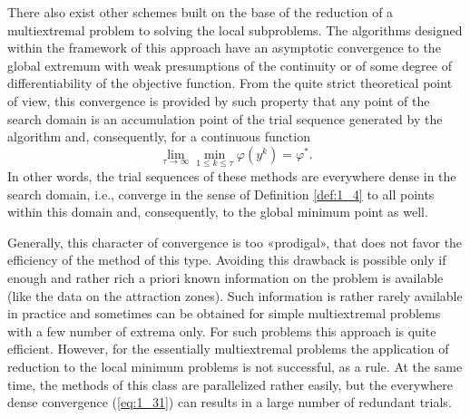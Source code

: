 There also exist other schemes built on the base of the reduction of a multiextremal problem to solving the local subproblems. The algorithms designed within the framework of this approach have an asymptotic convergence to the global extremum with weak presumptions of the continuity or of some degree of differentiability of the objective function. From the quite strict theoretical point of view, this convergence is provided by such property that any point of the search domain is an accumulation point of the trial sequence   generated by the algorithm and, consequently, for a continuous function
\begin{equation}
\label{eq:1_31}
\lim_{\tau \to \infty}\min_{1\leq k \leq \tau}{\varphi(y^k)}=\varphi^*.
\end{equation}
In other words, the trial sequences of these methods are everywhere dense in the search domain, i.e., converge in the sense of Definition \ref{def:1_4} to all points within this domain and, consequently, to the global minimum point as well. 

Generally, this character of convergence is too «prodigal», that does not favor the efficiency of the method of this type. Avoiding this drawback is possible only if enough and rather rich a priori known information on the problem is available (like the data on the attraction zones). Such information is rather rarely available in practice and sometimes can be obtained for simple multiextremal problems with a few number of extrema only. For such problems this approach is quite efficient. However, for the essentially multiextremal problems the application of reduction to the local minimum problems is not successful, as a rule. At the same time, the methods of this class are parallelized rather easily, but the everywhere dense convergence (\ref{eq:1_31}) can results in a large number of redundant trials. 

